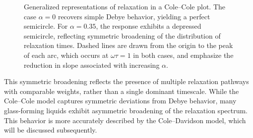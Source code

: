 \begin{figure}[!htbp]
	\centering
	\caption{Generalized representations of relaxation in a Cole--Cole plot. The case $\alpha = 0$ recovers simple Debye behavior, yielding a perfect semicircle. For $\alpha = 0.35$, the response exhibits a depressed semicircle, reflecting symmetric broadening of the distribution of relaxation times. Dashed lines are drawn from the origin to the peak of each arc, which occurs at $\omega\tau = 1$ in both cases, and emphasize the reduction in slope associated with increasing $\alpha$.}
	\label{fig:DebyeColeCole}
\end{figure}

\noindent This symmetric broadening reflects the presence of multiple relaxation pathways with comparable weights, rather than a single dominant timescale. While the Cole--Cole model captures symmetric deviations from Debye behavior, many glass-forming liquids exhibit asymmetric broadening of the relaxation spectrum. This behavior is more accurately described by the Cole--Davidson model, which will be discussed subsequently.

